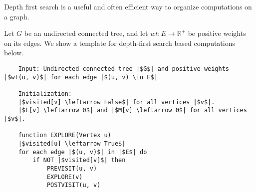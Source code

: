 \documentclass{article}
\begin{document}
Depth first search is a useful and often efficient way to organize computations on a graph.

Let $G$ be an undirected connected tree, and let $wt: E \rightarrow \mathbb{R}^{+}$ be positive weights on its edges. We show a template for depth-first search based computations below.

\begin{verbatim}
    Input: Undirected connected tree |$G$| and positive weights |$wt(u, v)$| for each edge |$(u, v) \in E$|

    Initialization:
    |$visited[v] \leftarrow False$| for all vertices |$v$|.
    |$L[v] \leftarrow 0$| and |$M[v] \leftarrow 0$| for all vertices |$v$|.

    function EXPLORE(Vertex u)
    |$visited[u] \leftarrow True$|
    for each edge |$(u, v)$| in |$E$| do    
        if NOT |$visited[v]$| then
            PREVISIT(u, v)
            EXPLORE(v)
            POSTVISIT(u, v)
\end{verbatim}
\end{document}
